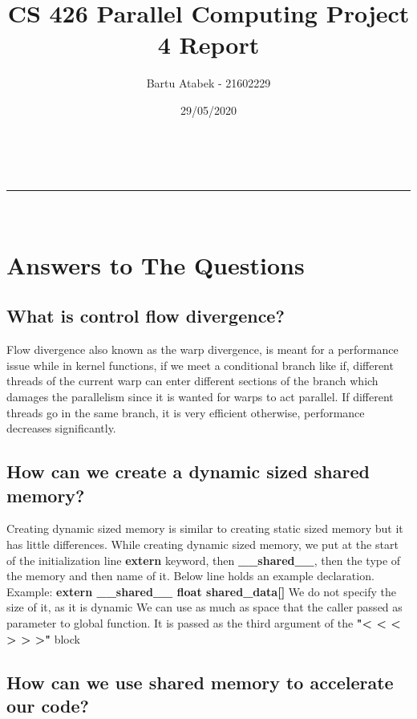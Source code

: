 \documentclass[a4paper,11pt]{article}
\makeatletter
\newcommand{\linia}{\rule{\linewidth}{0.5pt}}
\theoremstyle{mytheor}
\renewcommand{\maketitle}{
\begin{center}
\vspace{2ex}
{\huge \textsc{\@title}}
\vspace{1ex}
\\
\linia\\
\@author \hfill \@date
\vspace{4ex}
\end{center}
}
\makeatother
\begin{document}
\title{CS 426 Parallel Computing Project 4 Report}

\author{Bartu Atabek - 21602229}

\date{29/05/2020}

\maketitle

\section{Answers to The Questions}
\subsection{What is control flow divergence?}

Flow divergence also known as the warp divergence, is meant for a performance issue while in kernel functions, if we meet a conditional branch like if, different threads of the current warp can enter different sections of the branch which damages the parallelism since it is wanted for warps to act parallel. If different threads go in the same branch, it is very efficient otherwise, performance decreases significantly.

\subsection{How can we create a dynamic sized shared memory?}

Creating dynamic sized memory is similar to creating static sized memory but it has little differences. While creating dynamic sized memory, we put at the start of the initialization line \textbf{extern} keyword, then  \textbf{\_\_shared\_\_}, then the type of the memory and then name of it. Below line holds an example declaration.
\newline
\newline
Example: \textbf{extern \_\_shared\_\_ float shared\_data[]}
\newline
\newline
We do not specify the size of it, as it is dynamic We can use as much as space that the caller passed as parameter to global function. It is passed as the third argument of the \textbf{"< < <  > > >"} block

\subsection{How can we use shared memory to accelerate our code?}
\end{document}
